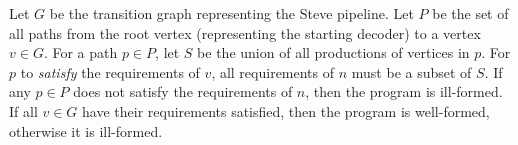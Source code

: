Let $G$ be the transition graph representing the Steve pipeline.
Let $P$ be the set of all paths from the root vertex (representing the starting decoder) to a vertex $v \in G$.
For a path $p \in P$, let $S$ be the union of all productions of vertices in $p$.
For $p$ to \emph{satisfy} the requirements of $v$,
all requirements of $n$ must be a subset of $S$.
If any $p \in P$ does not satisfy the requirements of $n$, then the program
is ill-formed. If all $v \in G$ have their requirements
satisfied, then the program is well-formed, otherwise it is ill-formed.

%
%

%
%
%

